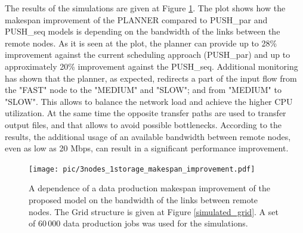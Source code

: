 \documentclass{svjour3}                     %
\begin{document}
The results of the simulations are given at Figure \ref{multi_makespan_compare}. The plot shows how the makespan improvement of the PLANNER compared to PUSH\_par and PUSH\_seq models is depending on the bandwidth of the links between the remote nodes. As it is seen at the plot, the planner can provide up to 28\% improvement against the current scheduling approach (PUSH\_par) and up to approximately 20\% improvement against the PUSH\_seq. Additional monitoring has shown that the planner, as expected, redirects a part of the input flow from the "FAST" node to the "MEDIUM" and "SLOW"; and from "MEDIUM" to "SLOW". This allows to balance the network load and achieve the higher CPU utilization. At the same time the opposite transfer paths are used to transfer output files, and that allows to avoid possible bottlenecks. According to the results, the additional usage of an available bandwidth between remote nodes, even as low as 20 Mbps, can result in a significant performance improvement.
\begin{figure}
  \begin{center}
    \texttt{[image: pic/3nodes\_1storage\_makespan\_improvement.pdf]}
    \caption{A dependence of a data production makespan improvement of the proposed model on the bandwidth of the links between remote nodes. The Grid structure is given at Figure \ref{simulated_grid}.  A set of 60\,000 data production jobs was used for the simulations.}
      \label{multi_makespan_compare}	
  \end{center}  
\end{figure}
\end{document}
